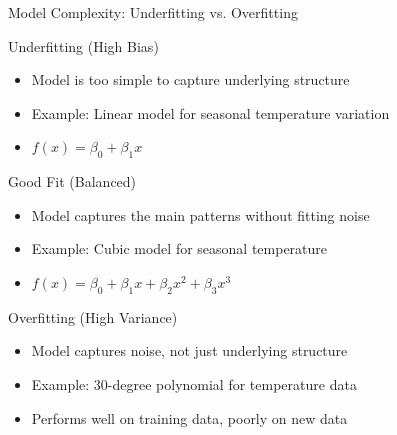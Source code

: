 \documentclass{beamer}
\begin{document}
\begin{frame}{Model Complexity: Underfitting vs. Overfitting}
  \begin{block}{Underfitting (High Bias)}
    \begin{itemize}
      \item Model is too simple to capture underlying structure
      \item Example: Linear model for seasonal temperature variation
      \item $f(x) = \beta_0 + \beta_1 x$
    \end{itemize}
  \end{block}
  
  \begin{block}{Good Fit (Balanced)}
    \begin{itemize}
      \item Model captures the main patterns without fitting noise
      \item Example: Cubic model for seasonal temperature
      \item $f(x) = \beta_0 + \beta_1 x + \beta_2 x^2 + \beta_3 x^3$
    \end{itemize}
  \end{block}
  
  \begin{block}{Overfitting (High Variance)}
    \begin{itemize}
      \item Model captures noise, not just underlying structure
      \item Example: 30-degree polynomial for temperature data
      \item Performs well on training data, poorly on new data
    \end{itemize}
  \end{block}
\end{frame}
\end{document}
